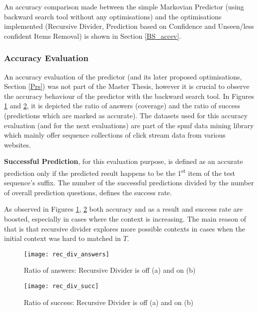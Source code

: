 \par An accuracy comparison made between the simple Markovian Predictor (using backward search tool without any optimisations) and the optimisations implemented (Recursive Divider, Prediction based on Confidence and Unseen/less confident Items Removal) is shown in Section \ref{BS_accev}.

\subsubsection{Accuracy Evaluation}{\label{BS_accev}}
An accuracy evaluation of the predictor (and its later proposed optimisations, Section \ref{Prs}) was not part of the Master Thesis, however it is crucial to observe the accuracy behaviour of the predictor with the backward search tool. In Figures \ref{fig:bs_pred_Ev1} and \ref{fig:bs_pred_Ev2}, it is depicted the ratio of answers (coverage) and the ratio of success (predictions which are marked as accurate). The datasets used for this accuracy evaluation (and for the next evaluations) are part of the spmf data mining library \citep{spmf} which mainly offer sequence collections of click stream data from various websites.
\par \textbf{Successful Prediction}, for this evaluation purpose, is defined as an accurate prediction only if the predicted result happens to be the 1\textsuperscript{st} item of the test sequence's suffix. The number of the successful predictions divided by the number of overall prediction questions, defines the success rate.
\par As observed in Figures \ref{fig:bs_pred_Ev1}, \ref{fig:bs_pred_Ev2} both accuracy and as a result and success rate are boosted, especially in cases where the context is increasing. The main reason of that is that recursive divider explores more possible contexts in cases when the initial context was hard to matched in $T$.



\begin{figure}[h]
    \centering
    \texttt{[image: rec\_div\_answers]}
    \caption{Ratio of answers: Recursive Divider is off (a) and on (b)}
    \label{fig:bs_pred_Ev1}
\end{figure}

\begin{figure}[h]
    \centering
    \texttt{[image: rec\_div\_succ]}
    \caption{Ratio of success: Recursive Divider is off (a) and on (b)}
    \label{fig:bs_pred_Ev2}
\end{figure}


